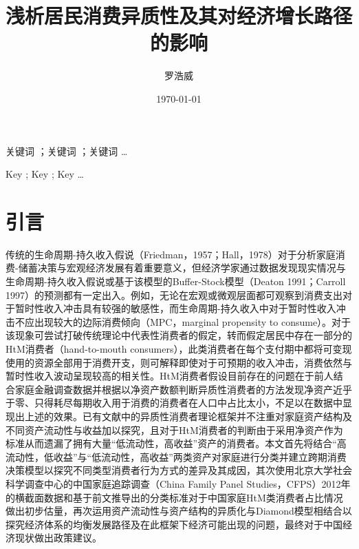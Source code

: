 \documentclass[supercite]{HustGraduPaper}
\title{浅析居民消费异质性及其对经济增长路径的影响}
\author{罗浩威}
\date{\today}
\begin{document}
    \maketitle
    \statement
    \clearpage 
    
    \begin{cnabstract}{关键词 ；关键词 ；关键词 }
    \ldots
        
    \end{cnabstract}
    
    \begin{enabstract}{Key ; Key ; Key }
    \ldots
        
    \end{enabstract}

    \tableofcontents
    \clearpage

    \section{引言}
    传统的生命周期-持久收入假说（Friedman，1957；Hall，1978）对于分析家庭消费-储蓄决策与宏观经济发展有着重要意义，但经济学家通过数据发现现实情况与生命周期-持久收入假说或基于该模型的Buffer-Stock模型（Deaton 1991；Carroll 1997）的预测都有一定出入。例如，无论在宏观或微观层面都可观察到消费支出对于暂时性收入冲击具有较强的敏感性，而生命周期-持久收入中对于暂时性收入冲击不应出现较大的边际消费倾向（MPC，marginal propensity to consume）。对于该现象可尝试打破传统理论中代表性消费者的假定，转而假定居民中存在一部分的HtM消费者（hand-to-mouth consumers），此类消费者在每个支付期中都将可变现使用的资源全部用于消费开支，则可解释即使对于可预期的收入冲击，消费依然与暂时性收入波动呈现较高的相关性。HtM消费者假设目前存在的问题在于前人结合家庭金融调查数据并根据以净资产数额判断异质性消费者的方法发现净资产近乎于零、只得耗尽每期收入用于消费的消费者在人口中占比太小，不足以在数据中显现出上述的效果。已有文献中的异质性消费者理论框架并不注重对家庭资产结构及不同资产流动性与收益加以探究，且对于HtM消费者的判断由于采用净资产作为标准从而遗漏了拥有大量“低流动性，高收益”资产的消费者。本文首先将结合“高流动性，低收益”与“低流动性，高收益”两类资产对家庭进行分类并建立跨期消费决策模型以探究不同类型消费者行为方式的差异及其成因，其次使用北京大学社会科学调查中心的中国家庭追踪调查（China Family Panel Studies，CFPS）2012年的横截面数据和基于前文推导出的分类标准对于中国家庭HtM类消费者占比情况做出初步估量，再次运用资产流动性与资产结构的异质化与Diamond模型相结合以探究经济体系的均衡发展路径及在此框架下经济可能出现的问题，最终对于中国经济现状做出政策建议。
\end{document}
